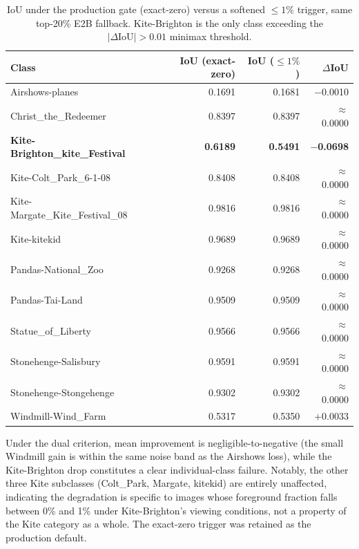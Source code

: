 \begin{table}[h]
\centering
\caption{IoU under the production gate (exact-zero) versus a softened
$\leq 1\%$ trigger, same top-20\% E2B fallback. Kite-Brighton is the only
class exceeding the $|\Delta\text{IoU}| > 0.01$ minimax threshold.}
\label{tab:e3-bypass-ablation}
\begin{tabular}{lrrr}
\toprule
Class & IoU (exact-zero) & IoU ($\leq 1\%$) & $\Delta$IoU \\
\midrule
Airshows-planes                         & 0.1691 & 0.1681 & $-$0.0010 \\
Christ\_the\_Redeemer                    & 0.8397 & 0.8397 & $\approx$0.0000 \\
\textbf{Kite-Brighton\_kite\_Festival}   & \textbf{0.6189} & \textbf{0.5491} & \textbf{$-$0.0698} \\
Kite-Colt\_Park\_6-1-08                 & 0.8408 & 0.8408 & $\approx$0.0000 \\
Kite-Margate\_Kite\_Festival\_08         & 0.9816 & 0.9816 & $\approx$0.0000 \\
Kite-kitekid                            & 0.9689 & 0.9689 & $\approx$0.0000 \\
Pandas-National\_Zoo                     & 0.9268 & 0.9268 & $\approx$0.0000 \\
Pandas-Tai-Land                         & 0.9509 & 0.9509 & $\approx$0.0000 \\
Statue\_of\_Liberty                      & 0.9566 & 0.9566 & $\approx$0.0000 \\
Stonehenge-Salisbury                    & 0.9591 & 0.9591 & $\approx$0.0000 \\
Stonehenge-Stongehenge                  & 0.9302 & 0.9302 & $\approx$0.0000 \\
Windmill-Wind\_Farm                     & 0.5317 & 0.5350 & $+$0.0033 \\
\bottomrule
\end{tabular}
\end{table}

Under the dual criterion, mean improvement is negligible-to-negative
(the small Windmill gain is within the same noise band as the Airshows
loss), while the Kite-Brighton drop constitutes a clear individual-class
failure. Notably, the other three Kite subclasses (Colt\_Park, Margate,
kitekid) are entirely unaffected, indicating the degradation is specific
to images whose foreground fraction falls between 0\% and 1\% under
Kite-Brighton's viewing conditions, not a property of the Kite category
as a whole. The exact-zero trigger was retained as the production
default.